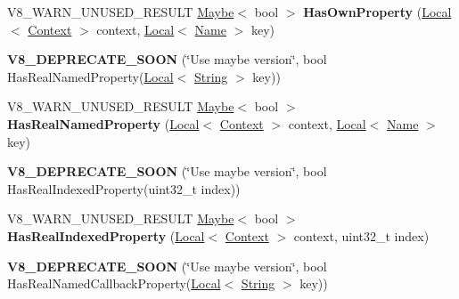 \begin{DoxyCompactItemize}
\item 
V8\+\_\+\+W\+A\+R\+N\+\_\+\+U\+N\+U\+S\+E\+D\+\_\+\+R\+E\+S\+U\+LT \hyperlink{classv8_1_1_maybe}{Maybe}$<$ bool $>$ {\bfseries Has\+Own\+Property} (\hyperlink{classv8_1_1_local}{Local}$<$ \hyperlink{classv8_1_1_context}{Context} $>$ context, \hyperlink{classv8_1_1_local}{Local}$<$ \hyperlink{classv8_1_1_name}{Name} $>$ key)\hypertarget{classv8_1_1_object_acdd3921e95d5bb1a27cea489792607ff}{}\label{classv8_1_1_object_acdd3921e95d5bb1a27cea489792607ff}

\item 
{\bfseries V8\+\_\+\+D\+E\+P\+R\+E\+C\+A\+T\+E\+\_\+\+S\+O\+ON} (\char`\"{}Use maybe version\char`\"{}, bool Has\+Real\+Named\+Property(\hyperlink{classv8_1_1_local}{Local}$<$ \hyperlink{classv8_1_1_string}{String} $>$ key))\hypertarget{classv8_1_1_object_abf24b52a108c801a74718e1a1e64ba5b}{}\label{classv8_1_1_object_abf24b52a108c801a74718e1a1e64ba5b}

\item 
V8\+\_\+\+W\+A\+R\+N\+\_\+\+U\+N\+U\+S\+E\+D\+\_\+\+R\+E\+S\+U\+LT \hyperlink{classv8_1_1_maybe}{Maybe}$<$ bool $>$ {\bfseries Has\+Real\+Named\+Property} (\hyperlink{classv8_1_1_local}{Local}$<$ \hyperlink{classv8_1_1_context}{Context} $>$ context, \hyperlink{classv8_1_1_local}{Local}$<$ \hyperlink{classv8_1_1_name}{Name} $>$ key)\hypertarget{classv8_1_1_object_ad830b937c7586fe2086b288ea79935c4}{}\label{classv8_1_1_object_ad830b937c7586fe2086b288ea79935c4}

\item 
{\bfseries V8\+\_\+\+D\+E\+P\+R\+E\+C\+A\+T\+E\+\_\+\+S\+O\+ON} (\char`\"{}Use maybe version\char`\"{}, bool Has\+Real\+Indexed\+Property(uint32\+\_\+t index))\hypertarget{classv8_1_1_object_abd04e5cb82426a70ebea6afec8687c9e}{}\label{classv8_1_1_object_abd04e5cb82426a70ebea6afec8687c9e}

\item 
V8\+\_\+\+W\+A\+R\+N\+\_\+\+U\+N\+U\+S\+E\+D\+\_\+\+R\+E\+S\+U\+LT \hyperlink{classv8_1_1_maybe}{Maybe}$<$ bool $>$ {\bfseries Has\+Real\+Indexed\+Property} (\hyperlink{classv8_1_1_local}{Local}$<$ \hyperlink{classv8_1_1_context}{Context} $>$ context, uint32\+\_\+t index)\hypertarget{classv8_1_1_object_a46de2f348f4caafca287328ce385ab56}{}\label{classv8_1_1_object_a46de2f348f4caafca287328ce385ab56}

\item 
{\bfseries V8\+\_\+\+D\+E\+P\+R\+E\+C\+A\+T\+E\+\_\+\+S\+O\+ON} (\char`\"{}Use maybe version\char`\"{}, bool Has\+Real\+Named\+Callback\+Property(\hyperlink{classv8_1_1_local}{Local}$<$ \hyperlink{classv8_1_1_string}{String} $>$ key))\hypertarget{classv8_1_1_object_ae1ffb11a0fa7549652d0530c0c4c4ca6}{}\label{classv8_1_1_object_ae1ffb11a0fa7549652d0530c0c4c4ca6}


\end{DoxyCompactItemize}
